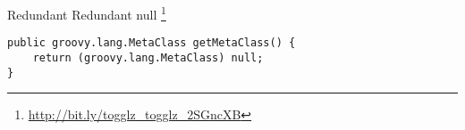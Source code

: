 \begin{pattern}{Redundant}
Redundant null
\footnote{\url{http://bit.ly/togglz_togglz_2SGncXB}}

\begin{verbatim}
public groovy.lang.MetaClass getMetaClass() {
    return (groovy.lang.MetaClass) null;
}
\end{verbatim}

\detection{}

\discussion{}

\related{}
    
\end{pattern}